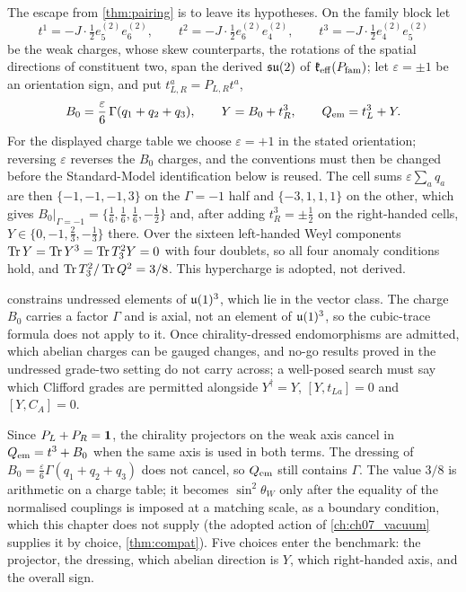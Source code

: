 The escape from \cref{thm:pairing} is to leave its hypotheses. On the family block let
\[
t^1=-J\cdot\tfrac12e^{(2)}_5e^{(2)}_6,\qquad t^2=-J\cdot\tfrac12e^{(2)}_6e^{(2)}_4,\qquad t^3=-J\cdot\tfrac12e^{(2)}_4e^{(2)}_5
\]
be the weak charges, whose skew counterparts, the rotations of the spatial directions of constituent two, span the derived $\mathfrak{su}(2)$ of
$\mathfrak k_{\rm eff}(P_{\rm fam})$; let $\varepsilon=\pm1$ be an orientation sign, and put $t^a_{L,R}=P_{L,R}t^a$,
\[
B_0=\frac\varepsilon6\,\Gamma(q_1+q_2+q_3),\qquad Y=B_0+t^3_R,\qquad Q_{\rm em}=t^3_L+Y .
\]
For the displayed charge table we choose $\varepsilon=+1$ in the stated orientation; reversing $\varepsilon$ reverses the $B_0$ charges, and the
conventions must then be changed before the Standard-Model identification below is reused. The cell sums $\varepsilon\sum_aq_a$ are then $\{-1,-1,-1,3\}$ on the $\Gamma=-1$ half and $\{-3,1,1,1\}$ on the other, which gives
$B_0|_{\Gamma=-1}=\{\tfrac16,\tfrac16,\tfrac16,-\tfrac12\}$ and, after adding $t^3_R=\pm\tfrac12$ on the right-handed cells,
$Y\in\{0,-1,\tfrac23,-\tfrac13\}$ there. Over the sixteen left-handed Weyl components $\operatorname{Tr} Y=\operatorname{Tr} Y^3=\operatorname{Tr} T_3^2Y=0$ with four doublets, so all
four anomaly conditions hold, and $\operatorname{Tr} T_3^2/\operatorname{Tr} Q^2=3/8$. This hypercharge is adopted, not derived.

\begin{proposition}
\label{prop:escape}
 constrains undressed elements of $\mathfrak{u}(1)^3$, which lie in the vector class. The charge $B_0$ carries a factor $\Gamma$ and is
axial, not an element of $\mathfrak{u}(1)^3$, so the cubic-trace formula does not apply to it. Once chirality-dressed endomorphisms are admitted,
which abelian charges can be gauged changes, and no-go results proved in the undressed grade-two setting do not carry across; a well-posed
search must say which Clifford grades are permitted alongside $Y^\dagger=Y$, $[Y,t_{La}]=0$ and $[Y,C_A]=0$.
\end{proposition}

Since $P_L+P_R=\mathbf 1$, the chirality projectors on the weak axis cancel in $Q_{\rm em}=t^3+B_0$ when the same axis is used in both terms. The
dressing of $B_0=\tfrac\varepsilon6\Gamma(q_1+q_2+q_3)$ does not cancel, so $Q_{\rm em}$ still contains $\Gamma$. The value $3/8$ is arithmetic on a
charge table; it becomes $\sin^2\theta_W$ only after the equality of the normalised couplings is imposed at a matching scale, as a boundary
condition, which this chapter does not supply (the adopted action of \cref{ch:ch07_vacuum} supplies it by choice, \cref{thm:compat}). Five choices enter the
benchmark: the projector, the dressing, which abelian direction is $Y$, which right-handed axis, and the overall sign.

